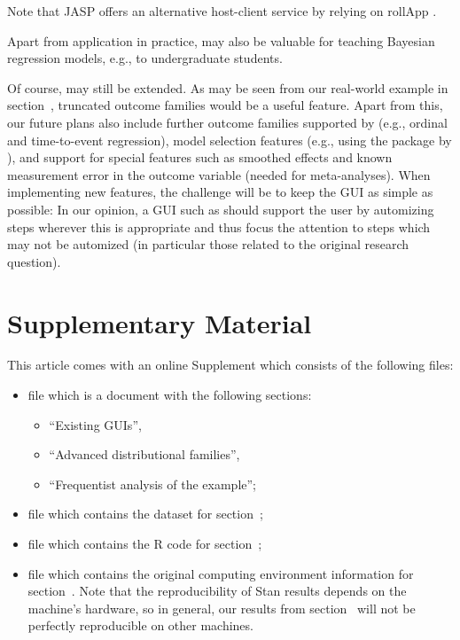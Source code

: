 Note that JASP offers an alternative host-client service by relying on
rollApp \citep{rollapp_inc_rollapp_2020, rollapp_inc_jasp_2020}.

Apart from application in practice,  may also be valuable for
teaching Bayesian regression models, e.g., to undergraduate students.

Of course,  may still be extended. As may be seen from our
real-world example in section~, truncated outcome families would be
a useful feature. Apart from this, our future plans also include further
outcome families supported by  (e.g., ordinal and time-to-event
regression), model selection features (e.g., using the package 
by \citealp{piironen_projpred_2020}), and support for special 
features such as smoothed effects and known measurement error in the outcome
variable (needed for meta-analyses). When implementing new features, the
challenge will be to keep the GUI as simple as possible: In our opinion, a GUI
such as  should support the user by automizing steps wherever
this is appropriate and thus focus the attention to steps which may not be
automized (in particular those related to the original research question).

\section{Supplementary Material}

This article comes with an online Supplement which consists of the following files:
\begin{itemize}
  \item file  which is a document with the
  following sections:
  \begin{itemize}
    \item ``Existing GUIs'',
    \item ``Advanced distributional families'',
    \item ``Frequentist analysis of the example'';
  \end{itemize}
  \item file  which contains the dataset for section~;
  \item file  which contains the R code for section~;
  \item file  which contains the original
  computing environment information for section~. Note that the
  reproducibility of Stan results depends on the machine's hardware, so in general,
  our results from section~ will not be perfectly reproducible on
  other machines.
\end{itemize}

